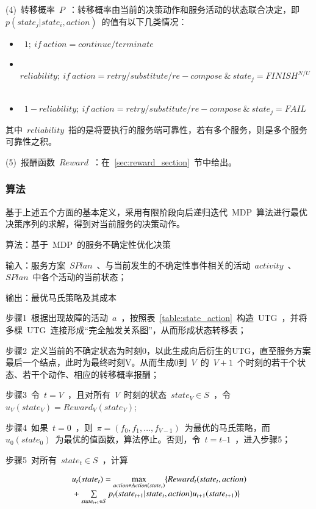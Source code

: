 (4)~转移概率~$P$~：转移概率由当前的决策动作和服务活动的状态联合决定，即~$p(state_j|state_i,action)$~的值有以下几类情况：
\begin{itemize}
\item ~$1;~if~action = continue/terminate$~
\item ~$reliability;~if~action = retry/substitute/re-compose~ \& ~ state_j = FINIS{H^{N/U}}$~
\item ~$1 - reliability;~if~action = retry/substitute/re-compose ~\& ~ state_j = FAIL$~
\end{itemize}
其中~$reliability$~指的是将要执行的服务端可靠性，若有多个服务，则是多个服务可靠性之积。

(5)~报酬函数~$Reward$~：在~\ref{sec:reward_section}~节中给出。

\subsubsection{算法}

基于上述五个方面的基本定义，采用有限阶段向后递归迭代~MDP~算法进行最优决策序列的求解，得到对当前服务的决策动作。

算法：基于~MDP~的服务不确定性优化决策

输入：服务方案~$SPlan$~、与当前发生的不确定性事件相关的活动~$activity$~、
~$SPlan$~中各个活动的当前状态；

输出：最优马氏策略及其成本

步骤1~根据出现故障的活动~$a$~，按照表~\ref{table:state_action}~构造~UTG~，并将多棵~UTG~连接形成“完全触发关系图”，从而形成状态转移表；

步骤2~定义当前的不确定状态为时刻0，以此生成向后衍生的UTG，直至服务方案最后一个结点，此时为最终时刻V。从而生成0到~$V$~的~$V+1$~个时刻的若干个状态、若干个动作、相应的转移概率报酬；

步骤3~令~$t=V$~，且对所有~$V$~时刻的状态~$state_V \in S$~，令~${u_V}( {state_V} ) = Reward_V( {state_V} )$;

步骤4~如果~$t=0$~，则~$\pi  = (f_0,f_1,\ldots ,f_{V-1})$~为最优的马氏策略，而~${u_0}( state_0)$~为最优的值函数，算法停止。否则，令~$t=t–1$~，进入步骤5；

步骤5~对所有~$state_t \in S$~，计算

\begin{equation}\label{equation:backward_mdp}
\begin{array}{l}
{u_t}(stat{e_t}) = \mathop {\max }\limits_{action \in Action(stat{e_t})} \{ Rewar{d_t}(stat{e_t},action)\\
{\rm{                        }} + \sum\limits_{stat{e_{t + 1}} \in S} {{p_t}(stat{e_{t + 1}}|stat{e_t},action){u_{t + 1}}(stat{e_{t + 1}})} \} 
\end{array}
\end{equation}

